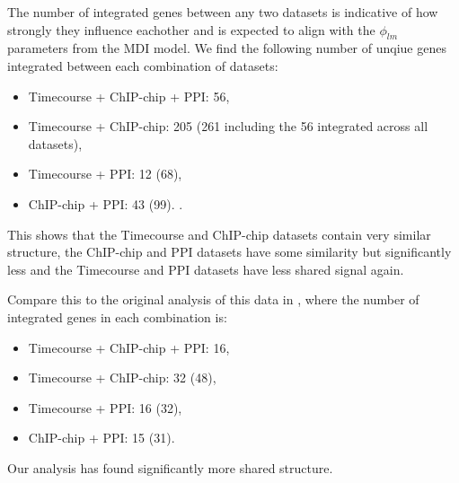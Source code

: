\documentclass[]{article}
\begin{document}
The number of integrated genes between any two datasets is indicative of how strongly they influence eachother and is expected to align with the $\phi_{lm}$ parameters from the MDI model. We find the following number of unqiue genes integrated between each combination of datasets:
\begin{itemize}	
	\item Timecourse + ChIP-chip + PPI: 56,
	\item Timecourse + ChIP-chip: 205 (261 including the 56 integrated across all datasets),
	\item Timecourse + PPI: 12 (68),
	\item ChIP-chip + PPI: 43 (99).
.
\end{itemize}
This shows that the Timecourse and ChIP-chip datasets contain very similar structure, the ChIP-chip and PPI datasets have some similarity but significantly less and the Timecourse and PPI datasets have less shared signal again. 

Compare this to the original analysis of this data in \cite{kirk2012bayesian}, where the number of integrated genes in each combination is:

\begin{itemize}
	\item Timecourse + ChIP-chip + PPI: 16,
	\item Timecourse + ChIP-chip: 32 (48),
	\item Timecourse + PPI: 16 (32),
	\item ChIP-chip + PPI: 15 (31).
\end{itemize}
Our analysis has found significantly more shared structure.

\end{document}
